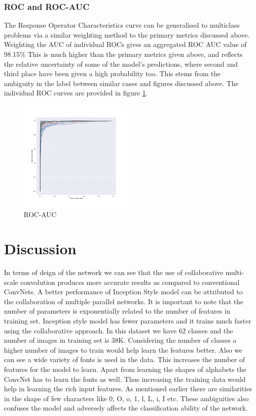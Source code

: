 \documentclass[fleqn,10pt]{SelfArx} %
\begin{document}
\subsubsection{ROC and ROC-AUC}
The Response Operator Characteristics curve can be generalised to multiclass problems via a similar weighting method to the primary metrics discussed above. Weighting the AUC of individual ROCs gives an aggregated ROC AUC value of 98.15\% This is much higher than the primary metrics given above, and reflects the relative uncertainty of some of the model's predictions, where second and third place have been given a high probability too. This stems from the ambiguity in the label between similar cases and figures discussed above. The individual ROC curves are provided in figure \ref{fig:roc}.
\begin{figure}[ht]\centering
\includegraphics[width=0.49\textwidth]{roc_curves}
\caption{ROC-AUC}
\label{fig:roc}
\end{figure}


\section{Discussion}
In terms of deign of the network we can see that the use of collaborative multi-scale convolution produces more accurate results as compared to conventional ConvNets. A better performance of Inception Style model can be attributed to the collaboration of multiple parallel networks. It is important to note that the number of parameters is exponentially related to the number of features in training set. Inception style model has fewer parameters and it trains much faster using the collaborative approach.
\newline
In this dataset we have 62 classes and the number of images in training set is 38K. Considering the number of classes a higher number of images to train would help learn the features better. Also we can see a wide variety of fonts is used in the data. This increases the number of features for the model to learn. Apart from learning the shapes of alphabets the ConvNet has to learn the fonts as well. Thus increasing the training data would help in learning the rich input features.
\newline
As mentioned earlier there are similarities in the shape of few characters like 0, O, o, 1, l, L, i, I etc. These ambiguities also confuses the model and adversely affects the classification ability of the network. 
\end{document}
